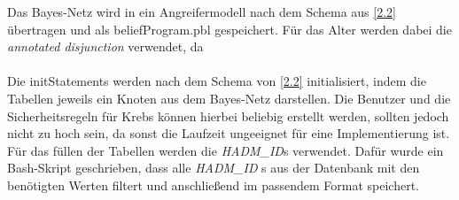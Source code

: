 \documentclass[german,version-2020-11]{uzl-thesis}
\begin{document}
Das Bayes-Netz wird in ein Angreifermodell nach dem Schema aus \ref{2.2} übertragen und als beliefProgram.pbl gespeichert. Für das Alter werden dabei die \textit{annotated disjunction} verwendet, da  \\ \\
Die initStatements werden nach dem Schema von \ref{2.2} initialisiert, indem die Tabellen jeweils ein Knoten aus dem Bayes-Netz darstellen. Die Benutzer und die Sicherheitsregeln für Krebs können hierbei beliebig erstellt werden, sollten jedoch nicht zu hoch sein, da sonst die Laufzeit ungeeignet für eine Implementierung ist. \\ 
Für das füllen der Tabellen werden die \textit{HADM\_ID}s verwendet. Dafür wurde ein Bash-Skript geschrieben, dass alle \textit{HADM\_ID} s aus der Datenbank mit den benötigten Werten filtert und anschließend im passendem Format speichert.
\end{document}
